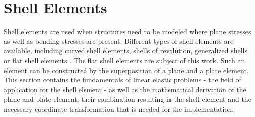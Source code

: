 \section{Shell Elements}\label{sec:Shell}
 Shell elements are used when structures need to be modeled where plane stresses as well as bending stresses are present. Different types of shell elements are available, including curved shell elements, shells of revolution, generalized shells or flat shell elements \cite{cook2002concepts}. The flat shell elements are subject of this work. Such an element can be constructed by the superposition of a plane and a plate element. This section contains the fundamentals of linear elastic problems - the field of application for the shell element - as well as the mathematical derivation of the plane and plate element, their combination resulting in the shell element and the necessary coordinate transformation that is needed for the implementation. 
 
 
